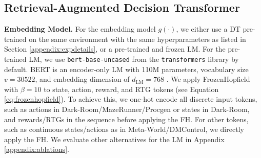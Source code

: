 \documentclass{article}
\begin{document}
\subsection{Retrieval-Augmented Decision Transformer}\label{appendix:radt-details}
\textbf{Embedding Model.}
For the embedding model $g(\cdot)$, we either use a DT pre-trained on the same environment with the same hyperparameters as listed in Section \ref{appendix:expdetails}, or a pre-trained and frozen LM.
For the pre-trained LM, we use \texttt{bert-base-uncased} from the \texttt{transformers} library by default.
BERT is an encoder-only LM with 110M parameters, vocabulary size $v=30522$, and embedding dimension of $d_{\text{LM}}=768$ \citep{Devlin:18}.
We apply FrozenHopfield with $\beta=10$ to state, action, reward, and RTG tokens (see Equation \ref{eq:frozenhopfield}).
To achieve this, we one-hot encode all discrete input tokens, such as actions in Dark-Room/MazeRunner/Procgen or states in Dark-Room, and rewards/RTGs in the sequence before applying the FH.
For other tokens, such as continuous states/actions as in Meta-World/DMControl, we directly apply the FH.
We evaluate other alternatives for the LM in Appendix \ref{appendix:ablations}.
\renewcommand{\algorithmicensure}{\textbf{Output:}}
\renewcommand{\algorithmicrequire}{\textbf{Input:}}
\renewcommand{\algorithmiccomment}[1]{$\triangleright$ #1}
\end{document}

